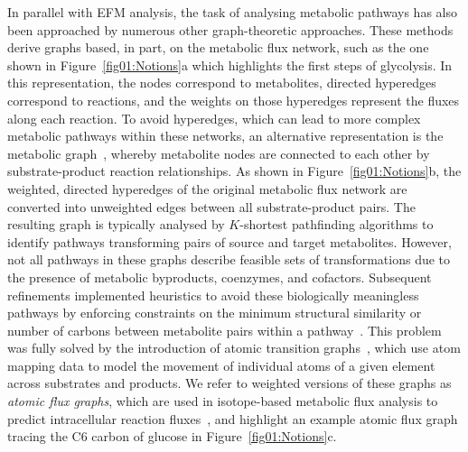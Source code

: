\documentclass[12pt]{article}
\begin{document}
In parallel with EFM analysis, the task of analysing metabolic
pathways has also been approached by numerous other graph-theoretic
approaches. These methods derive graphs based, in part, on the metabolic
flux network, such as the one shown in Figure~\ref{fig01:Notions}a which
highlights the first steps of glycolysis. In this representation, the
nodes correspond to metabolites, directed hyperedges correspond to
reactions, and the weights on those hyperedges represent the fluxes along
each reaction. To avoid hyperedges, which can lead to more complex
metabolic pathways within these networks, an alternative representation is
the metabolic graph~\citep{AritaMasanori2000Mrus,WagnerAndreas2001Tswi},
whereby metabolite nodes are connected to each other by substrate-product
reaction relationships. As shown in Figure~\ref{fig01:Notions}b, the
weighted, directed hyperedges of the original metabolic flux network are
converted into unweighted edges between all substrate-product pairs. The
resulting graph is typically analysed by $K$-shortest pathfinding
algorithms to identify pathways transforming pairs of source and target
metabolites. However, not all pathways in these graphs describe feasible
sets of transformations due to the presence of metabolic byproducts,
coenzymes, and cofactors. Subsequent refinements implemented heuristics to
avoid these biologically meaningless pathways by enforcing constraints on
the minimum structural similarity or number of carbons between metabolite
pairs within
a pathway~\citep{McShanD2003PathMiner,RahmanSA2004Mpaw,CroesDidier2006IMPi,PeyJon2011Pfma,HafnerJasmin2021NFmp}.
This problem was fully solved by the introduction of atomic transition
graphs~\citep{AritaMasanori2003ISAT}, which use atom mapping data to model
the movement of individual atoms of a given element across substrates and
products. We refer to weighted versions of these graphs as \emph{atomic
flux graphs}, which are used in isotope-based metabolic flux analysis to
predict intracellular reaction
fluxes~\citep{WiechertWolfgang1999Brsi,WeitzelMichael2007Ttom}, and
highlight an example atomic flux graph tracing the C6 carbon of glucose in
Figure~\ref{fig01:Notions}c.
\end{document}
